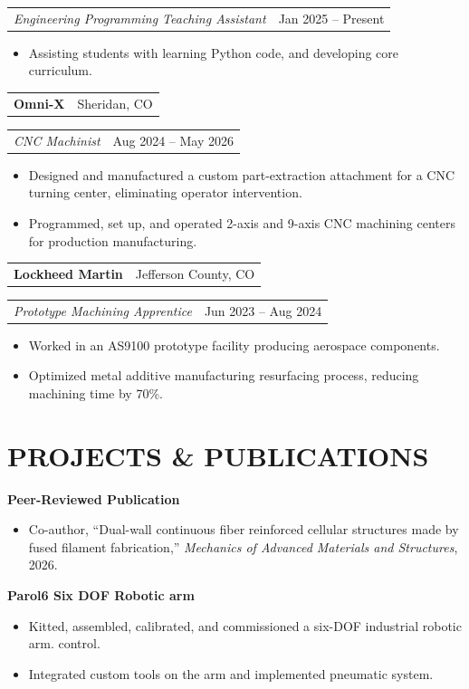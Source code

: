 \documentclass[10pt]{article}
\makeatletter
\newcommand{\companyLine}[2]{
\noindent
\begin{tabular*}{\textwidth}{@{\extracolsep{\fill}} l r}
\textbf{#1} & #2 \\
\end{tabular*}
}
\newcommand{\roleLine}[2]{
\noindent
\begin{tabular*}{\textwidth}{@{\extracolsep{\fill}} l r}
\textit{#1} & #2 \\
\end{tabular*}
}
\makeatother
\begin{document}
\vspace{.2em}

\roleLine{Engineering Programming Teaching Assistant}{Jan 2025 -- Present}
\begin{itemize}
\item Assisting students with learning Python code, and developing core curriculum.
\end{itemize}

\vspace{.2em}

\companyLine{Omni-X}{Sheridan, CO}
\roleLine{CNC Machinist}{Aug 2024 -- May 2026}
\begin{itemize}
\item Designed and manufactured a custom part-extraction attachment for a CNC turning center, eliminating operator intervention.
\item Programmed, set up, and operated 2-axis and 9-axis CNC machining centers for production manufacturing.
\end{itemize}

\vspace{.2em}

\companyLine{Lockheed Martin}{Jefferson County, CO}
\roleLine{Prototype Machining Apprentice}{Jun 2023 -- Aug 2024}
\begin{itemize}
\item Worked in an AS9100 prototype facility producing aerospace components.
\item Optimized metal additive manufacturing resurfacing process, reducing machining time by 70\%.
\end{itemize}

\vspace{.2em}

\section*{PROJECTS \& PUBLICATIONS}

\textbf{Peer-Reviewed Publication}
\begin{itemize}
\item Co-author, ``Dual-wall continuous fiber reinforced cellular structures made by fused filament fabrication,'' \textit{Mechanics of Advanced Materials and Structures}, 2026.
\end{itemize}

\vspace{.2em}

\textbf{Parol6 Six DOF Robotic arm}
\begin{itemize}
\item Kitted, assembled, calibrated, and commissioned a six-DOF industrial robotic arm.
control.
\item Integrated custom tools on the arm and implemented pneumatic system.
\end{itemize}
\end{document}
